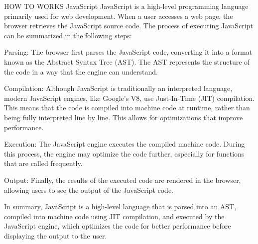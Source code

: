 HOW TO WORKS JavaScript
JavaScript is a high-level programming language primarily used for web development. When a user accesses a web page, the browser retrieves the JavaScript source code. The process of executing JavaScript can be summarized in the following steps:    

Parsing: The browser first parses the JavaScript code, converting it into a format known as the Abstract Syntax Tree (AST). The AST represents the structure of the code in a way that the engine can understand.    

Compilation: Although JavaScript is traditionally an interpreted language, modern JavaScript engines, like Google's V8, use Just-In-Time (JIT) compilation. This means that the code is compiled into machine code at runtime, rather than being fully interpreted line by line. This allows for optimizations that improve performance.    

Execution: The JavaScript engine executes the compiled machine code. During this process, the engine may optimize the code further, especially for functions that are called frequently.    

Output: Finally, the results of the executed code are rendered in the browser, allowing users to see the output of the JavaScript code.    

In summary, JavaScript is a high-level language that is parsed into an AST, compiled into machine code using JIT compilation, and executed by the JavaScript engine, which optimizes the code for better performance before displaying the output to the user.